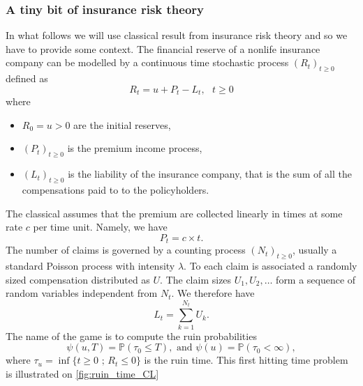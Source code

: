 \subsubsection{A tiny bit of insurance risk theory}\label{sssec:insurance_risk_theory}
In what follows we will use classical result from insurance risk theory and so we have to provide some context. The financial reserve of a nonlife insurance company can be modelled by a continuous time stochastic process $(R_t)_{t\geq0}$ defined as 
\begin{equation}\label{eq:risk_process}
R_t = u + P_t - L_t,\text{ }t\geq0
\end{equation}
where 
\begin{itemize}
  \item $R_0 = u>0$ are the initial reserves,
  \item $(P_t)_{t\geq0}$ is the premium income process,
  \item $(L_t)_{t\geq0}$ is the liability of the insurance company, that is the sum of all the compensations paid to to the policyholders.
\end{itemize}
The classical assumes that the premium are collected linearly in times at some rate $c$ per time unit. Namely, we have 
$$
P_t = c\times t.
$$
The number of claims is governed by a counting process $(N_t)_{t\geq0}$, usually a standard Poisson process with intensity $\lambda$. To each claim is associated a randomly sized compensation distributed as $U$. The claim sizes $U_1,U_2,\ldots$ form a sequence of \iid random variables independent from $N_t$. We therefore have 
$$
L_t = \sum_{k = 1}^{N_t}U_k.
$$
The name of the game is to compute the ruin probabilities 
\begin{equation}\label{eq:ruin_probabilities}
\psi(u,T) = \mathbb{P}(\tau_0 \leq T),\text{ and }\psi(u) = \mathbb{P}(\tau_0 < \infty),
\end{equation} 
where $\tau_u = \inf\{t\geq0\text{ ; }R_t \leq 0\}$ is the ruin time. This first hitting time problem is illustrated on \cref{fig:ruin_time_CL}
